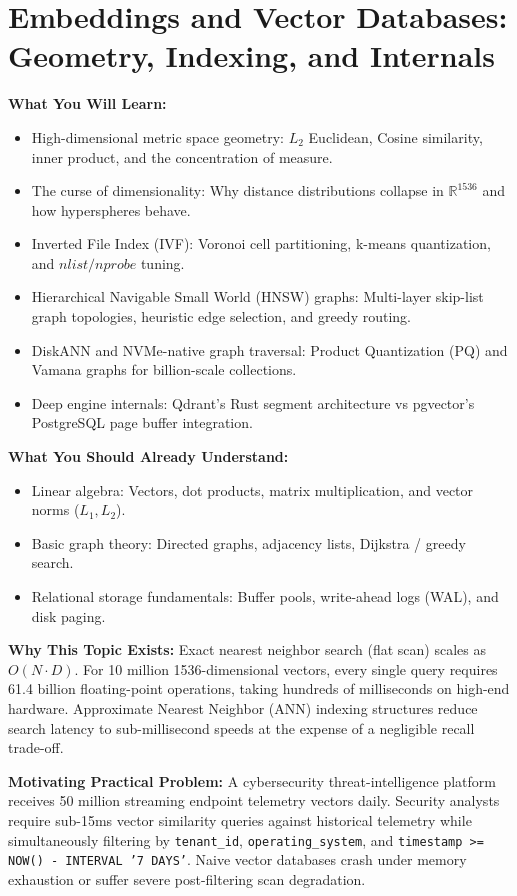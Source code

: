 \chapter{Embeddings and Vector Databases: Geometry, Indexing, and Internals}
\label{ch:embeddings_vector_db}

\begin{chaptergoalsbox}
\textbf{What You Will Learn:}
\begin{itemize}[leftmargin=15pt]
  \item High-dimensional metric space geometry: $L_2$ Euclidean, Cosine similarity, inner product, and the concentration of measure.
  \item The curse of dimensionality: Why distance distributions collapse in $\mathbb{R}^{1536}$ and how hyperspheres behave.
  \item Inverted File Index (IVF): Voronoi cell partitioning, k-means quantization, and $nlist/nprobe$ tuning.
  \item Hierarchical Navigable Small World (HNSW) graphs: Multi-layer skip-list graph topologies, heuristic edge selection, and greedy routing.
  \item DiskANN and NVMe-native graph traversal: Product Quantization (PQ) and Vamana graphs for billion-scale collections.
  \item Deep engine internals: Qdrant's Rust segment architecture vs pgvector's PostgreSQL page buffer integration.
\end{itemize}

\textbf{What You Should Already Understand:}
\begin{itemize}[leftmargin=15pt]
  \item Linear algebra: Vectors, dot products, matrix multiplication, and vector norms ($L_1, L_2$).
  \item Basic graph theory: Directed graphs, adjacency lists, Dijkstra / greedy search.
  \item Relational storage fundamentals: Buffer pools, write-ahead logs (WAL), and disk paging.
\end{itemize}

\textbf{Why This Topic Exists:}
Exact nearest neighbor search (flat scan) scales as $O(N \cdot D)$. For 10 million 1536-dimensional vectors, every single query requires 61.4 billion floating-point operations, taking hundreds of milliseconds on high-end hardware. Approximate Nearest Neighbor (ANN) indexing structures reduce search latency to sub-millisecond speeds at the expense of a negligible recall trade-off.

\textbf{Motivating Practical Problem:}
A cybersecurity threat-intelligence platform receives 50 million streaming endpoint telemetry vectors daily. Security analysts require sub-15ms vector similarity queries against historical telemetry while simultaneously filtering by \texttt{tenant\_id}, \texttt{operating\_system}, and \texttt{timestamp \textgreater{}= NOW() - INTERVAL '7 DAYS'}. Naive vector databases crash under memory exhaustion or suffer severe post-filtering scan degradation.
\end{chaptergoalsbox}

